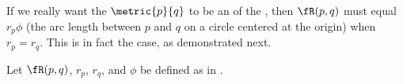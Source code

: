 If we really want the  $\metric{p}{q}$ to be an 
of the , then $\fR(p,q)$ must equal $r_p\phi$ 
(the arc length between $p$ and $q$ on a circle centered at the origin) when $r_p=r_q$.
This is in fact the case, as demonstrated next.
\begin{proposition}
\label{prop:larcR_rho}
Let $\fR(p,q)$, $r_p$, $r_q$, and $\phi$ be defined as in .
\end{proposition}
